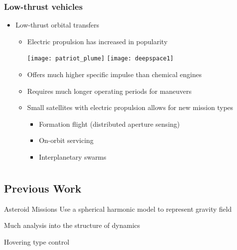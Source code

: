 \documentclass[11pt,professionalfonts]{beamer}
\begin{document}
\begin{frame} %
\frametitle{Low-thrust vehicles} %
\begin{itemize}
    \item Low-thrust orbital transfers
    \begin{itemize}
        \item Electric propulsion has increased in popularity

        \texttt{[image: patriot\_plume]}
        \hfill
        \texttt{[image: deepspace1]}
 
        \item Offers much higher specific impulse than chemical engines 
        \item Requires much longer operating periods for maneuvers 
        \item Small satellites with electric propulsion allows for new mission types
            \begin{itemize}
                \item Formation flight (distributed aperture sensing)
                \item On-orbit servicing
                \item Interplanetary swarms
            \end{itemize}
    \end{itemize}
\end{itemize}
\end{frame}   %

\section*{}
\subsection*{Previous Work}

\begin{frame}{Asteroid Missions} %
Use a spherical harmonic model to represent gravity field

Much analysis into the structure of dynamics

Hovering type control
\end{frame}   %

\section*{}
\end{document}

